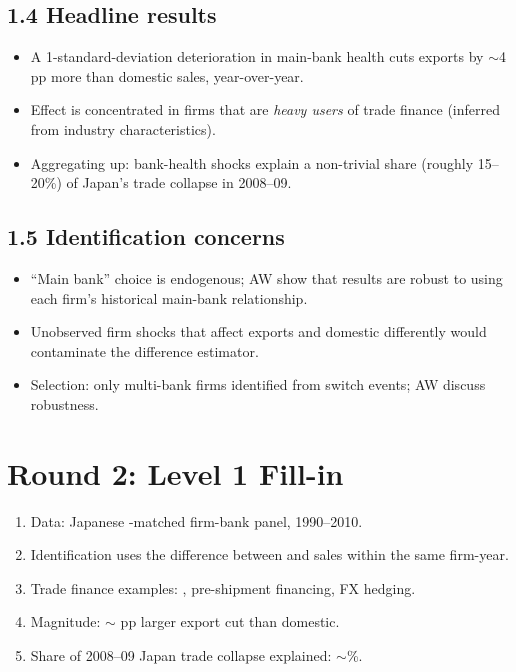 \documentclass[11pt]{article}
\newcommand{\blank}[1]{\underline{\hspace{#1}}}
\begin{document}
\subsection*{1.4 Headline results}
\begin{itemize}
\item A 1-standard-deviation deterioration in main-bank health cuts exports by $\sim$4 pp more than domestic sales, year-over-year.
\item Effect is concentrated in firms that are \emph{heavy users} of trade finance (inferred from industry characteristics).
\item Aggregating up: bank-health shocks explain a non-trivial share (roughly 15--20\%) of Japan's trade collapse in 2008--09.
\end{itemize}

\subsection*{1.5 Identification concerns}
\begin{alertbox}
\begin{itemize}
\item ``Main bank'' choice is endogenous; AW show that results are robust to using each firm's historical main-bank relationship.
\item Unobserved firm shocks that affect exports and domestic differently would contaminate the difference estimator.
\item Selection: only multi-bank firms identified from switch events; AW discuss robustness.
\end{itemize}
\end{alertbox}

\section*{Round 2: Level 1 Fill-in}
\begin{enumerate}
\item Data: Japanese \blank{1.5cm}-matched firm-bank panel, 1990--2010.
\item Identification uses the difference between \blank{1cm} and \blank{1cm} sales within the same firm-year.
\item Trade finance examples: \blank{1cm}, pre-shipment financing, FX hedging.
\item Magnitude: $\sim$\blank{1cm} pp larger export cut than domestic.
\item Share of 2008--09 Japan trade collapse explained: $\sim$\blank{1cm}\%.
\end{enumerate}
\end{document}
